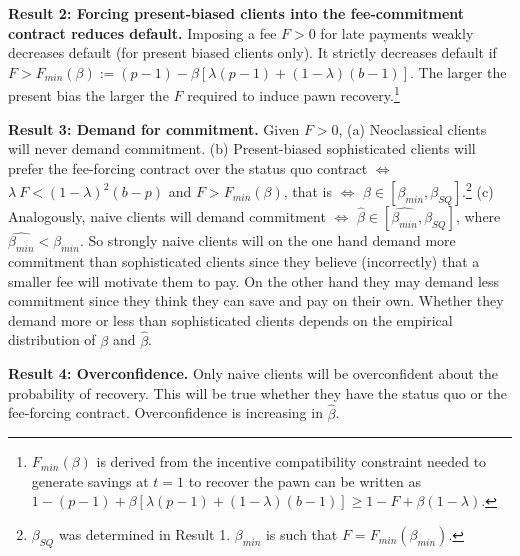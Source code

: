 \vspace{.1in}
\noindent \textbf{Result 2: Forcing present-biased clients into the fee-commitment contract reduces default.} Imposing a fee $F>0$ for late payments weakly decreases default (for present biased clients only). It strictly decreases default if $F>F_{min}(\beta):=(p-1)-\beta[\lambda(p-1)+(1-\lambda)(b-1)]$. The larger the present bias the larger the $F$ required to induce pawn recovery.\footnote{$F_{min}(\beta)$ is derived from the incentive compatibility constraint needed to generate savings at $t=1$ to recover the pawn can be written as $1-(p-1)+\beta[\lambda(p-1)+(1-\lambda)(b-1)] \geq 1-F+\beta(1-\lambda)$.}

\vspace{.1in}
\noindent \textbf{Result 3: Demand for commitment.} Given $F>0$, (a) Neoclassical clients will never demand commitment. (b) Present-biased sophisticated clients will prefer the fee-forcing contract over the status quo contract $\iff$  $\lambda \: F<(1-\lambda)^2(b-p)$ and $F>F_{min}(\beta)$, that is $\iff$  $\beta \in [\beta_{min},\beta_{SQ}]$.\footnote{$\beta_{SQ}$ was determined in Result 1. $\beta_{min}$ is such that $F=F_{min}(\beta_{min})$.} (c) Analogously, naive clients will demand commitment $\iff$ $\hat{\beta} \in [\widehat{\beta_{min}},\beta_{SQ}]$, where $\widehat{\beta_{min}}<\beta_{min}$. So strongly naive clients will on the one hand demand more commitment than sophisticated clients since they believe (incorrectly) that a smaller fee will motivate them to pay. On the other hand they may demand less commitment since they think they can save and pay on their own. Whether they demand more or less than sophisticated clients depends on the empirical distribution of $\beta$ and $\hat{\beta}$. 

\vspace{.1in}
\noindent \textbf{Result 4: Overconfidence.} Only naive clients will be overconfident about the probability of recovery. This will be true whether they have the status quo or the fee-forcing contract. Overconfidence is increasing in $\hat{\beta}$.

